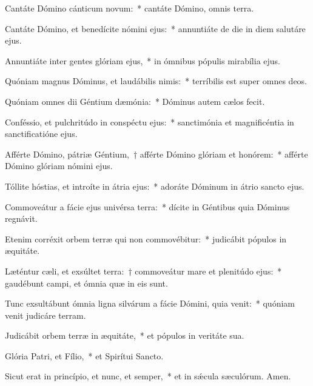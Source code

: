 \item Cantáte Dómino cánticum novum:~* cantáte Dómino, omnis terra.

\item Cantáte Dómino, et benedícite nómini ejus:~* annuntiáte de die in diem salutáre ejus.

\item Annuntiáte inter gentes glóriam ejus,~* in ómnibus pópulis mirabília ejus.

\item Quóniam magnus Dóminus, et laudábilis nimis:~* terríbilis est super omnes deos.

\item Quóniam omnes dii Géntium dæmónia:~* Dóminus autem cælos fecit.

\item Conféssio, et pulchritúdo in conspéctu ejus:~* sanctimónia et magnificéntia in sanctificatióne ejus.

\item Afférte Dómino, pátriæ Géntium,~† afférte Dómino glóriam et honórem:~* afférte Dómino glóriam nómini ejus.

\item Tóllite hóstias, et introíte in átria ejus:~* adoráte Dóminum in átrio sancto ejus.

\item Commoveátur a fácie ejus univérsa terra:~* dícite in Géntibus quia Dóminus regnávit.

\item Etenim corréxit orbem terræ qui non commovébitur:~* judicábit pópulos in æquitáte.

\item Læténtur cæli, et exsúltet terra:~† commoveátur mare et plenitúdo ejus:~* gaudébunt campi, et ómnia quæ in eis sunt.

\item Tunc exsultábunt ómnia ligna silvárum a fácie Dómini, quia venit:~* quóniam venit judicáre terram.

\item Judicábit orbem terræ in æquitáte,~* et pópulos in veritáte sua.

\item Glória Patri, et Fílio,~* et Spirítui Sancto.

\item Sicut erat in princípio, et nunc, et semper,~* et in sǽcula sæculórum. Amen.


